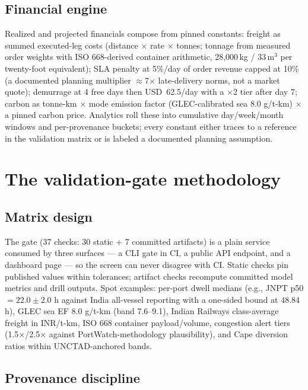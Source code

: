 \documentclass[11pt]{article}
\begin{document}
\subsection{Financial engine}

Realized and projected financials compose from pinned constants:
freight as summed executed-leg costs (distance $\times$ rate $\times$
tonnes; tonnage from measured order weights with ISO 668-derived
container arithmetic, 28{,}000\,kg / 33\,m$^3$ per twenty-foot
equivalent); SLA penalty at 5\%/day of order revenue capped at 10\% (a
documented planning multiplier $\approx$7$\times$ late-delivery norms,
not a market quote); demurrage at 4 free days then USD~62.5/day with a
$\times$2 tier after day 7; carbon as tonne-km $\times$ mode emission
factor (GLEC-calibrated sea 8.0 g/t-km) $\times$ a pinned carbon price.
Analytics roll these into cumulative day/week/month windows and
per-provenance buckets; every constant either traces to a reference in
the validation matrix or is labeled a documented planning assumption.

\section{The validation-gate methodology}

\subsection{Matrix design}

The gate (37 checks: 30 static + 7 committed artifacts) is a plain
service consumed by three surfaces --- a CLI gate in CI, a public API
endpoint, and a dashboard page --- so the screen can never disagree with
CI. Static checks pin published values within tolerances; artifact
checks recompute committed model metrics and drill outputs. Spot
examples: per-port dwell medians (e.g., JNPT p50 $= 22.0 \pm 2.0$ h
against India all-vessel reporting with a one-sided bound at 48.84 h),
GLEC sea EF $8.0$ g/t-km (band 7.6--9.1), Indian Railways class-average
freight in INR/t-km, ISO 668 container payload/volume, congestion alert
tiers (1.5$\times$/2.5$\times$ against PortWatch-methodology
plausibility), and Cape diversion ratios within UNCTAD-anchored bands.

\subsection{Provenance discipline}
\end{document}
